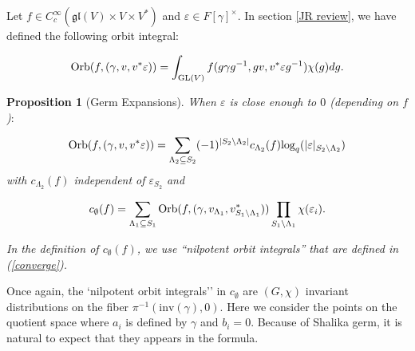\documentclass[11pt, oneside,reqno]{amsart}   	%
\newtheorem{proposition}[theorem]{Proposition}
\begin{document}
 Let $f \in  C_c^\infty (\mathfrak{gl}(V)\times V\times V^*)$ and $\varepsilon \in F[\gamma]^\times$.  In section \ref{JR review}, we have defined the following orbit integral: 
 
 $$\textup{Orb}(f,(\gamma,v,v^*\varepsilon)) = \int_{\textup{GL}(V)}f(g\gamma g^{-1},gv,v^*\varepsilon g^{-1})\chi(g)dg.$$
 
 \begin{proposition} [Germ Expansions]
 
When $\varepsilon$ is close enough to $0$ \textup{(}depending on $f$\textup{)}$:$

$$\textup{Orb}(f,(\gamma,v,v^*\varepsilon))=\sum_{\Lambda_2 \subseteq S_2}(-1)^{|S_2 \backslash \Lambda_2|} c_{\Lambda_2}(f) \textup{log}_q(|\varepsilon|_{S_2 \backslash \Lambda_2})$$
with $c_{\Lambda_2}(f)$ independent of $\varepsilon_{S_2}$ and 
 
 $$c_\emptyset(f)=\sum_{\Lambda_1 \subseteq S_1}  \textup{Orb}(f,(\gamma,v_{\Lambda_1},v_{S_1 \backslash \Lambda_1}^*))\prod_{S_1 \backslash \Lambda_1}\chi(\varepsilon_i).$$
 
In the definition of $c_\emptyset(f)$, we use ``nilpotent orbit integrals'' that are defined in \textup{(\ref{converge})}.
 \end{proposition}
 
 Once again,  the `nilpotent orbit integrals'' in $c_\emptyset$ are $(G,\chi)$ invariant distributions on the fiber $\pi^{-1}(\text{inv}(\gamma),0)$. Here we consider the points on the quotient space where $a_i$ is defined by $\gamma$ and $b_i=0$. Because of  Shalika germ, it is natural to expect that they appears in the formula.
 
\end{document}
